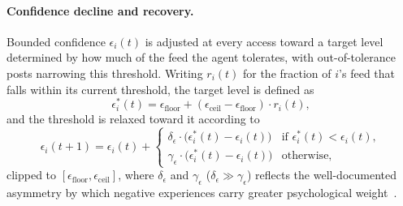 \documentclass{svproc}
\def\BoundedConfidence{\epsilon} %
\begin{document}
\paragraph{Confidence decline and recovery.}
Bounded confidence $\BoundedConfidence_i(t)$ is adjusted at every
access toward a target level determined by how much of the feed the
agent tolerates, with out-of-tolerance posts narrowing this
threshold. Writing $r_i(t)$ for the fraction of $i$'s feed that falls
within its current threshold, the target level is defined as
%
\begin{equation} 
  \BoundedConfidence_i^{\ast}(t) =
  \BoundedConfidence_{\mathrm{floor}} + (\BoundedConfidence_{\mathrm{ceil}}-\BoundedConfidence_{\mathrm{floor}})\cdot r_i(t), 
\end{equation} 
%
and the threshold is relaxed toward it according to 
%
\begin{equation} 
  \BoundedConfidence_i(t{+}1) = \BoundedConfidence_i(t) +
  \begin{cases}
    \delta_{\BoundedConfidence}\cdot
    \big(\BoundedConfidence_i^{\ast}(t)-\BoundedConfidence_i(t)\big)
    & \text{if } \BoundedConfidence_i^{\ast}(t) <
    \BoundedConfidence_i(t), \\[2pt]
    \gamma_{\BoundedConfidence}\cdot
    \big(\BoundedConfidence_i^{\ast}(t)-\BoundedConfidence_i(t)\big)
      & \text{otherwise},
  \end{cases}\label{eq:bc}
\end{equation} 
%
clipped to
$[\BoundedConfidence_{\mathrm{floor}},\BoundedConfidence_{\mathrm{ceil}}]$,
where $\delta_{\BoundedConfidence}$ and $\gamma_{\BoundedConfidence}$
($\delta_{\BoundedConfidence}\gg\gamma_{\BoundedConfidence}$) reflects
the well-documented asymmetry by which negative experiences carry
greater psychological weight~\cite{baumeister2001}.
\par
\end{document}
